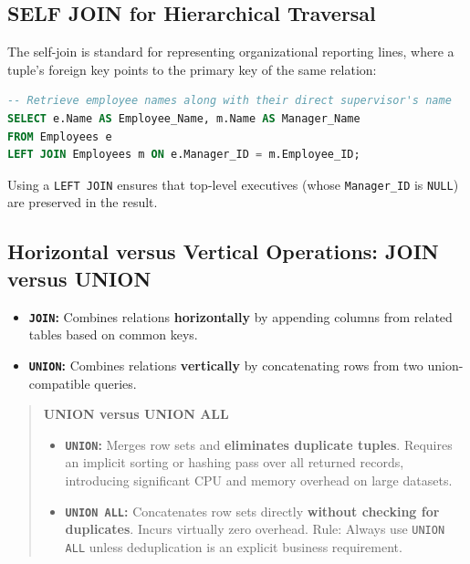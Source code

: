 \subsection{SELF JOIN for Hierarchical Traversal}
The self-join is standard for representing organizational reporting lines, where a tuple's foreign key points to the primary key of the same relation:
\begin{lstlisting}[language=SQL]
-- Retrieve employee names along with their direct supervisor's name
SELECT e.Name AS Employee_Name, m.Name AS Manager_Name
FROM Employees e
LEFT JOIN Employees m ON e.Manager_ID = m.Employee_ID;
\end{lstlisting}
Using a \texttt{LEFT JOIN} ensures that top-level executives (whose \texttt{Manager\_ID} is \texttt{NULL}) are preserved in the result.

\subsection{Horizontal versus Vertical Operations: JOIN versus UNION}
\begin{itemize}
    \item \textbf{\texttt{JOIN}:} Combines relations \textbf{horizontally} by appending columns from related tables based on common keys.
    \item \textbf{\texttt{UNION}:} Combines relations \textbf{vertically} by concatenating rows from two union-compatible queries.
\end{itemize}

\begin{quote}
\textbf{UNION versus UNION ALL}
\begin{itemize}
    \item \textbf{\texttt{UNION}:} Merges row sets and \textbf{eliminates duplicate tuples}. Requires an implicit sorting or hashing pass over all returned records, introducing significant CPU and memory overhead on large datasets.
    \item \textbf{\texttt{UNION ALL}:} Concatenates row sets directly \textbf{without checking for duplicates}. Incurs virtually zero overhead. Rule: Always use \texttt{UNION ALL} unless deduplication is an explicit business requirement.
\end{itemize}
\end{quote}

